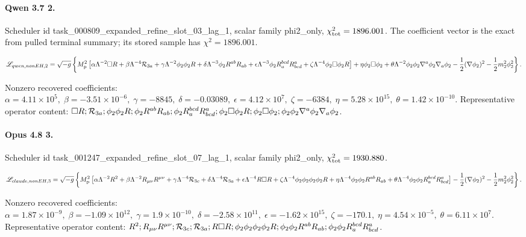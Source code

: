 \documentclass[aps,prd,twocolumn,superscriptaddress,nofootinbib,longbibliography]{revtex4-2}
\newcommand{\Mp}{M_{\rm p}}
\newcommand{\chiT}{\chi^2_{\rm tot}}
\begin{document}
\paragraph*{Qwen 3.7 2.} Scheduler id task\_000809\_expanded\_refine\_slot\_03\_lag\_1, scalar family phi2\_only, $\chiT=1896.001$. The coefficient vector is the exact from pulled terminal summary; its stored sample has $\chi^2=1896.001$.
\begin{widetext}
\begin{equation}
\mathscr{L}_{qwen,nonEH,2}=\sqrt{-g}\left\{\Mp^2\left[\alpha \Lambda^{-2} \Box R + \beta \Lambda^{-4} {\cal R}_{3a} + \gamma \Lambda^{-2} \phi_2 \phi_2 R + \delta \Lambda^{-3} \phi_2 R^{ab} R_{ab} + \epsilon \Lambda^{-3} \phi_2 R^{bcd}_{a} R^{a}_{bcd} + \zeta \Lambda^{-4} \phi_2 \Box\phi_2 R\right] + \eta \phi_2 \Box\phi_2 + \theta \Lambda^{-2} \phi_2 \phi_2 \nabla^{a}\phi_2 \nabla_{a}\phi_2 - \frac12(\nabla\phi_2)^2 - \frac12m_2^2\phi_2^2\right\}.
\end{equation}
\end{widetext}
\noindent Nonzero recovered coefficients: $\alpha=4.11\times 10^{5},\; \beta=-3.51\times 10^{-6},\; \gamma=-8845,\; \delta=-0.03089,\; \epsilon=4.12\times 10^{7},\; \zeta=-6384,\; \eta=5.28\times 10^{15},\; \theta=1.42\times 10^{-10}$. Representative operator content: $\Box R; {\cal R}_{3a}; \phi_2 \phi_2 R; \phi_2 R^{ab} R_{ab}; \phi_2 R^{bcd}_{a} R^{a}_{bcd}; \phi_2 \Box\phi_2 R; \phi_2 \Box\phi_2; \phi_2 \phi_2 \nabla^{a}\phi_2 \nabla_{a}\phi_2$.

\paragraph*{Opus 4.8 3.} Scheduler id task\_001247\_expanded\_refine\_slot\_07\_lag\_1, scalar family phi2\_only, $\chiT=1930.880$.
\begin{widetext}
\begin{equation}
\mathscr{L}_{claude,nonEH,3}=\sqrt{-g}\left\{\Mp^2\left[\alpha \Lambda^{-2} R^2 + \beta \Lambda^{-2} R_{\mu\nu}R^{\mu\nu} + \gamma \Lambda^{-4} {\cal R}_{3c} + \delta \Lambda^{-4} {\cal R}_{3a} + \epsilon \Lambda^{-4} R\Box R + \zeta \Lambda^{-4} \phi_2 \phi_2 \phi_2 \phi_2 R + \eta \Lambda^{-4} \phi_2 \phi_2 R^{ab} R_{ab} + \theta \Lambda^{-4} \phi_2 \phi_2 R^{bcd}_{a} R^{a}_{bcd}\right] - \frac12(\nabla\phi_2)^2 - \frac12m_2^2\phi_2^2\right\}.
\end{equation}
\end{widetext}
\noindent Nonzero recovered coefficients: $\alpha=1.87\times 10^{-9},\; \beta=-1.09\times 10^{12},\; \gamma=1.9\times 10^{-10},\; \delta=-2.58\times 10^{11},\; \epsilon=-1.62\times 10^{15},\; \zeta=-170.1,\; \eta=4.54\times 10^{-5},\; \theta=6.11\times 10^{7}$. Representative operator content: $R^2; R_{\mu\nu}R^{\mu\nu}; {\cal R}_{3c}; {\cal R}_{3a}; R\Box R; \phi_2 \phi_2 \phi_2 \phi_2 R; \phi_2 \phi_2 R^{ab} R_{ab}; \phi_2 \phi_2 R^{bcd}_{a} R^{a}_{bcd}$.
\end{document}
